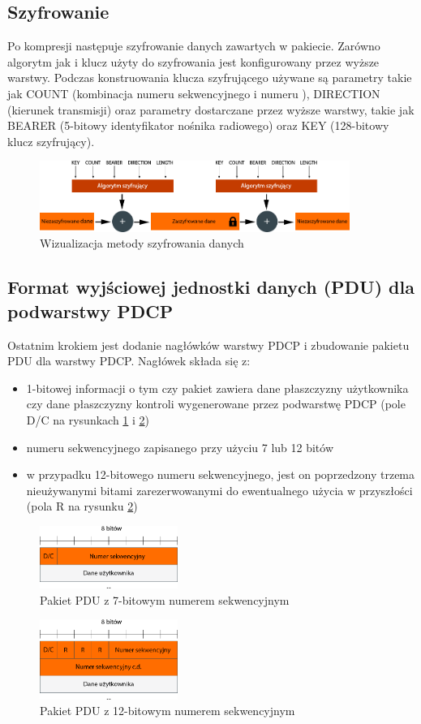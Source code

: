 \subsection{Szyfrowanie}

Po kompresji następuje szyfrowanie danych zawartych w pakiecie. Zarówno algorytm jak i klucz użyty do szyfrowania jest konfigurowany przez wyższe warstwy. Podczas konstruowania klucza szyfrującego używane są parametry takie jak COUNT (kombinacja numeru sekwencyjnego i numeru ), DIRECTION (kierunek transmisji) oraz parametry dostarczane przez wyższe warstwy, takie jak BEARER (5-bitowy identyfikator nośnika radiowego) oraz KEY (128-bitowy klucz szyfrujący).

\begin{figure}[ht]
	\centerline{\includegraphics[width=0.9\textwidth]{images/pdcp-eps.png}}
	\caption{Wizualizacja metody szyfrowania danych}
\end{figure}

\subsection{Format wyjściowej jednostki danych (PDU) dla podwarstwy PDCP}

Ostatnim krokiem jest dodanie nagłówków warstwy PDCP i zbudowanie pakietu PDU dla warstwy PDCP. Nagłówek składa się z:
\begin{itemize}
	\item 1-bitowej informacji o tym czy pakiet zawiera dane płaszczyzny użytkownika czy dane płaszczyzny kontroli wygenerowane przez podwarstwę PDCP (pole D/C na rysunkach \ref{fig:pdcp7bit} i \ref{fig:pdcp12bit})
	\item numeru sekwencyjnego zapisanego przy użyciu 7 lub 12 bitów
	\item w przypadku 12-bitowego numeru sekwencyjnego, jest on poprzedzony trzema nieużywanymi bitami zarezerwowanymi do ewentualnego użycia w przyszłości (pola R na rysunku \ref{fig:pdcp12bit})
\end{itemize}

\begin{figure}[ht]
	\centerline{\includegraphics[width=0.4\textwidth]{images/pdcp-pdu-7bit.png}}
	\caption{Pakiet PDU z 7-bitowym numerem sekwencyjnym}
	\label{fig:pdcp7bit}
\end{figure}

\begin{figure}[ht]
	\centerline{\includegraphics[width=0.4\textwidth]{images/pdcp-pdu-12bit.png}}
	\caption{Pakiet PDU z 12-bitowym numerem sekwencyjnym}
	\label{fig:pdcp12bit}
\end{figure}
